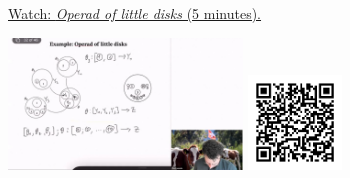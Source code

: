 
\begin{minipage}{10cm}
    \href{https://act4e-spring21.netlify.app/videos/spring2021-operads-a:operad-disks.html}{Watch: \emph{Operad of little disks} (5 minutes).}
        
    \href{https://act4e-spring21.netlify.app/videos/spring2021-operads-a:operad-disks.html}{\includegraphics[height=3.5cm]{spring2021-operads-a:operad-disks/thumbnails.jpg}}
    \href{https://act4e-spring21.netlify.app/videos/spring2021-operads-a:operad-disks.html}{\includegraphics[height=2.5cm]{spring2021-operads-a:operad-disks/qrcode.png}}
\end{minipage}
